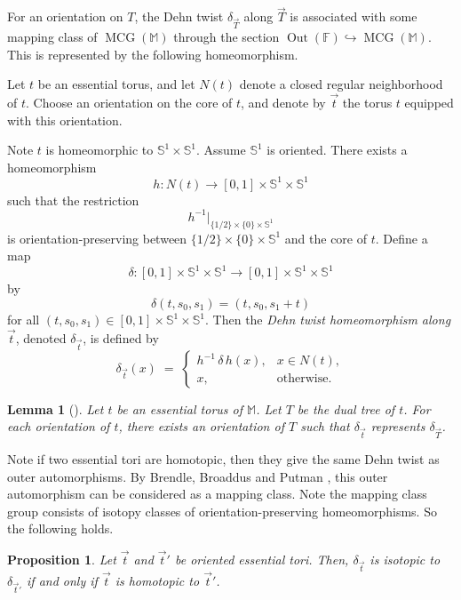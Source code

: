 \documentclass[12pt,a4paper]{amsart}
\numberwithin{equation}{section}
\DeclareMathOperator{\MCG}{MCG}
\DeclareMathOperator{\Out}{Out}
\newcommand{\FF}{\mathbb{F}}
\newcommand{\MM}{\mathbb{M}}
\theoremstyle{plain}
\newtheorem{proposition}[theorem]{Proposition}
\newtheorem{lemma}[theorem]{Lemma}
\theoremstyle{definition}
\theoremstyle{remark}
\begin{document}
For an orientation on $T$, the Dehn twist $\delta_{\vec{T}}$ along $\vec{T}$ is associated with some mapping class of $\MCG(\MM)$ through the section $\Out(\FF) \hookrightarrow \MCG(\MM)$.
This is represented by the following homeomorphism.

Let \(t\) be an essential torus, and let \(N(t)\) denote a closed regular neighborhood of \(t\).  
Choose an orientation on the core of \(t\), and denote by \(\vec{t}\) the torus \(t\) equipped with this orientation.  

Note $t$ is homeomorphic to $\mathbb{S}^1 \times \mathbb{S}^1$.
Assume $\mathbb{S}^1$ is oriented.
There exists a homeomorphism
\[
    h : N(t) \to [0,1] \times \mathbb{S}^1 \times \mathbb{S}^1
\]
such that the restriction
\[
    h^{-1}\big|_{\{1/2\} \times \{0\} \times \mathbb{S}^1}
\]
is orientation-preserving between \(\{1/2\} \times \{0\} \times \mathbb{S}^1\) and the core of \(t\).
Define a map \[\delta : [0,1] \times \mathbb{S}^1 \times \mathbb{S}^1 \to [0,1] \times \mathbb{S}^1 \times \mathbb{S}^1\] by
\[
    \delta(t, s_0, s_1) = (t, s_0, s_1+t)
\]
for all $(t, s_0, s_1) \in [0,1] \times \mathbb{S}^1 \times \mathbb{S}^1$.
Then the \emph{Dehn twist homeomorphism along $\vec{t}$}, denoted $\delta_{\vec{t}}$, is defined by
\[
    \delta_{\vec{t}}(x) \;=\;
    \begin{cases}
    h^{-1}\,\delta\,h(x), & x \in N(t), \\
    x, & \text{otherwise.}
    \end{cases}
\]

\begin{lemma}[{\cite[Lemma 2.6]{MR3677931}}] \label{lem:gul}
    Let $t$ be an essential torus of $\MM$.
    Let $T$ be the dual tree of $t$.
    For each orientation of $t$, there exists an orientation of $T$ such that $\delta_{\vec{t}}$ represents $\delta_{\vec{T}}$.
\end{lemma}

Note if two essential tori are homotopic, then they give the same Dehn twist as outer automorphisms.
By Brendle, Broaddus and Putman \cite{MR4557874}, this outer automorphism can be considered as a mapping class.
Note the mapping class group consists of isotopy classes of orientation-preserving homeomorphisms.
So the following holds.

\begin{proposition} \label{prop:coincide}
    Let $\vec{t}$ and $\vec{t}'$ be oriented essential tori.
    Then, $\delta_{\vec{t}}$ is isotopic to $\delta_{\vec{t}'}$ if and only if $\vec{t}$ is homotopic to $\vec{t}'$.
\end{proposition}
\end{document}
